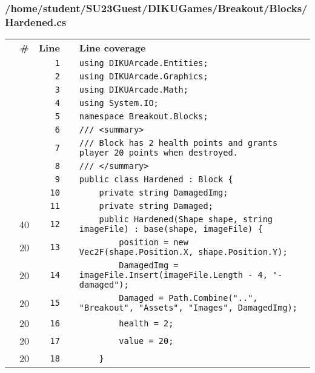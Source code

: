 \documentclass[a4paper,landscape,10pt]{article}
\begin{document}
\subsubsection{/home/student/SU23Guest/DIKUGames/Breakout/Blocks/Hardened.cs}
\begin{longtable}[l]{lrrll}
\textbf{} & \textbf{\#} & \textbf{Line} & \textbf{} & \textbf{Line coverage}\\
\cellcolor{gray} &  & \verb~1~ & & \verb~using DIKUArcade.Entities;~\\
\cellcolor{gray} &  & \verb~2~ & & \verb~using DIKUArcade.Graphics;~\\
\cellcolor{gray} &  & \verb~3~ & & \verb~using DIKUArcade.Math;~\\
\cellcolor{gray} &  & \verb~4~ & & \verb~using System.IO;~\\
\cellcolor{gray} &  & \verb~5~ & & \verb~namespace Breakout.Blocks;~\\
\cellcolor{gray} &  & \verb~6~ & & \verb~/// <summary>~\\
\cellcolor{gray} &  & \verb~7~ & & \verb~/// Block has 2 health points and grants player 20 points when destroyed.~\\
\cellcolor{gray} &  & \verb~8~ & & \verb~/// </summary>~\\
\cellcolor{gray} &  & \verb~9~ & & \verb~public class Hardened : Block {~\\
\cellcolor{gray} &  & \verb~10~ & & \verb~    private string DamagedImg;~\\
\cellcolor{gray} &  & \verb~11~ & & \verb~    private string Damaged;~\\
\cellcolor{green} & 40 & \verb~12~ & & \verb~    public Hardened(Shape shape, string imageFile) : base(shape, imageFile) {~\\
\cellcolor{green} & 20 & \verb~13~ & & \verb~        position = new Vec2F(shape.Position.X, shape.Position.Y);~\\
\cellcolor{green} & 20 & \verb~14~ & & \verb~        DamagedImg = imageFile.Insert(imageFile.Length - 4, "-damaged");~\\
\cellcolor{green} & 20 & \verb~15~ & & \verb~        Damaged = Path.Combine("..", "Breakout", "Assets", "Images", DamagedImg);~\\
\cellcolor{green} & 20 & \verb~16~ & & \verb~        health = 2;~\\
\cellcolor{green} & 20 & \verb~17~ & & \verb~        value = 20;~\\
\cellcolor{green} & 20 & \verb~18~ & & \verb~    }~\\

\end{longtable}
\end{document}
